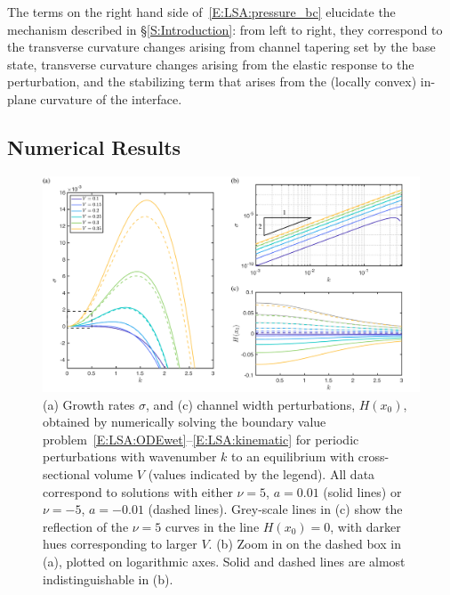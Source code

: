 \documentclass{jfm}
\begin{document}
The terms on the right hand side of~\eqref{E:LSA:pressure_bc} elucidate the mechanism described in \S\ref{S:Introduction}: from left to right, they correspond to the transverse curvature changes arising from channel tapering set by the base state, transverse curvature changes arising from the elastic response to the perturbation, and the stabilizing term that arises from the (locally convex) in-plane curvature of the interface.


\subsection{Numerical Results}

\begin{figure}
\centering
\includegraphics[width =\textwidth]{figures/fig6_growth_rates.pdf}
\caption{(a) Growth rates $\sigma$, and (c) channel width perturbations, $H(x_0)$, obtained by numerically solving the boundary value problem~\eqref{E:LSA:ODEwet}--\eqref{E:LSA:kinematic} for periodic perturbations with wavenumber $k$ to an equilibrium with cross-sectional volume $V$ (values indicated by the legend). All data correspond to solutions with either $\nu = 5$, $a = 0.01$ (solid lines) or $\nu = -5$, $a = -0.01$ (dashed lines). Grey-scale lines in (c) show the reflection of the $\nu = 5$ curves in the line $H(x_0) = 0$, with darker hues corresponding to larger $V$. (b) Zoom in on the dashed box in (a), plotted on logarithmic axes. Solid and dashed lines are almost indistinguishable in (b).}
\label{fig:LinearStability:GrowthRates}
\end{figure}
\end{document}
